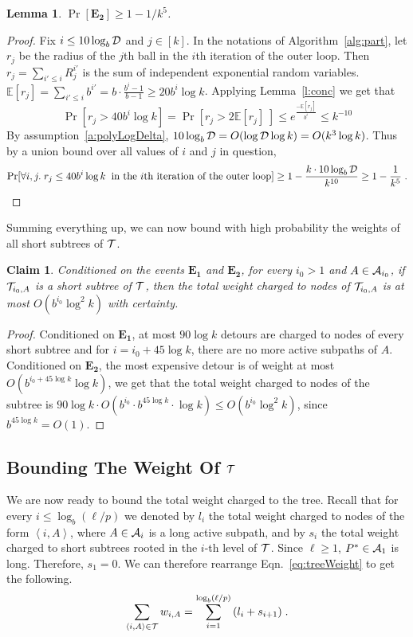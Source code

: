 \documentclass[twoside,leqno,twocolumn]{article}
\newtheorem{claim}[lemma]{Claim}
\newtheorem{lemma}[theorem]{Lemma}
\newtheorem{claim}[theorem]{Claim}
\newcommand{\calD}{{\mathcal D}}
\begin{document}
\begin{lemma} \label{l:radii}
$\Pr[\mathbf{E_2}] \ge 1 - 1/k^5$.
\end{lemma}
\begin{proof}
Fix $i \le \iter$ and $j \in [k]$. 
In the notations of Algorithm~\ref{alg:part}, let $r_j$ be the radius of the $j$th ball in the $i$th iteration of the outer loop. Then $r_j = \sum_{i' \le i}{R_j^{i'}}$ is the sum of independent exponential random variables.
$\mathbb{E}[r_j] = \sum_{i' \le i}{b^{i'}} = b \cdot \frac{b^i-1}{b-1} \ge 20b^i \log k$. Applying Lemma~\ref{l:conc} we get that 
$$\Pr[r_j > 40b^i \log k ] = \Pr[r_j > 2 \mathbb{E}[r_j] \;] \le e^{\frac{-\mathbb{E}[r_j]}{b^i}} \le k^{-10}$$
By assumption~\ref{a:polyLogDelta}, $\iter = O(\log \calD \log k) = O(k^3 \log k)$.
Thus by a union bound over all values of $i$ and $j$ in question, 
$$\Pr[\forall i ,j. \;  r_j \le 40 b^i \log k \; \; \text{in the $i$th iteration of the outer loop}] \ge 1 - \frac{k \cdot \iter}{k^{10}} \ge 1 - \frac{1}{k^5} \;.$$
\end{proof}

Summing everything up, we can now bound with high probability the weights of all short subtrees of ${\cal T}$. 
\begin{claim} \label{c:shortWeight}
Conditioned on the events $\mathbf{E_1}$ and $\mathbf{E_2}$, for every $i_0 > 1$ and $A \in {\cal A}_{i_0}$, if ${\cal T}_{i_0,A}$ is a short subtree of ${\cal T}$, then the total weight charged to nodes of ${\cal T}_{i_0,A}$ is at most $O(b^{i_0} \log^2 k)$ with certainty.
\end{claim}
\begin{proof}
Conditioned on $\mathbf{E_1}$, at most $90 \log k$ detours are charged to nodes of every short subtree and for $i = i_0 + 45\log k$, there are no more active subpaths of $A$. Conditioned on $\mathbf{E_2}$, the most expensive detour is of weight at most $O(b^{i_0+45\log k}\log k)$, we get that the total weight charged to nodes of the subtree is $90 \log k \cdot O(b^{i_0} \cdot b^{45\log k} \cdot \log k) \le O(b^{i_0} \log^2 k)$, since $b^{45 \log k} = O(1)$. \end{proof}
\subsection{Bounding The Weight Of ${\cal T}$}
We are now ready to bound the total weight charged to the tree. 
Recall that for every $i \le \log_b(\ell/p)$ we denoted by $l_i$ the total weight charged to nodes of the form $\left\langle i,A \right\rangle$, where $A \in {\cal A}_i$ is a long active subpath, and by $s_i$ the total weight charged to short subtrees rooted in the $i$-th level of ${\cal T}$. 
Since $\ell \ge 1$, $P^* \in {\cal A}_1$ is long. Therefore, $s_1=0$. We can therefore rearrange Eqn.~\eqref{eq:treeWeight} to get the following.
\begin{equation}
\sum_{\langle i,A \rangle \in {\cal T}}{w_{i,A}} = \sum_{i=1}^{\log_b (\ell/p)}{(l_i+s_{i+1})} \;.
\label{eq:treeWeight2}
\end{equation}
\end{document}

